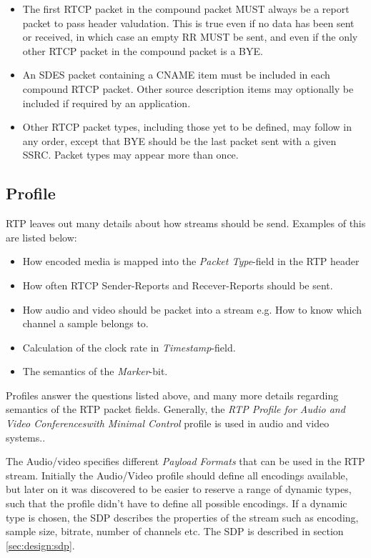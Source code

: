 \begin{itemize}
	\item The first RTCP packet in the compound packet MUST always be a report packet to pass header valudation. This is true even if no data has been sent or received, in which case an empty RR MUST be sent, and even if the only other RTCP packet in the compound packet is a BYE.
      
    \item An SDES packet containing a CNAME item must be included in each compound RTCP packet. Other source description items may optionally be included if required by an application.
      
    \item Other RTCP packet types, including those yet to be defined, may follow in any order, except that BYE should be the last packet sent with a given SSRC. Packet types may appear more than once.
\end{itemize}


\subsection{Profile} \label{sec:design:profile}
RTP leaves out many details about how streams should be send.
Examples of this are listed below:
\begin{itemize}
	\item How encoded media is mapped into the \textit{Packet Type}-field in the RTP header
	\item How often RTCP Sender-Reports and Recever-Reports should be sent.
	\item How audio and video should be packet into a stream e.g. How to know which channel a sample belongs to.
	\item Calculation of the clock rate in \textit{Timestamp}-field.
	\item The semantics of the \textit{Marker}-bit.
\end{itemize}

Profiles answer the questions listed above, and many more details regarding semantics of the RTP packet fields. Generally, the \textit{RTP Profile for Audio and Video Conferenceswith Minimal Control}\citep{RFC3551} profile is used in audio and video systems.\citep{perkins2003rtp}.

The Audio/video specifies different \textit{Payload Formats} that can be used in the RTP stream. Initially the Audio/Video profile should define all encodings available, but later on it was discovered to be easier to reserve a range of dynamic types, such that the profile didn't have to define all possible encodings. If a dynamic type is chosen, the SDP describes the properties of the stream such as encoding, sample size, bitrate, number of channels etc. The SDP is described in section \ref{sec:design:sdp}.

